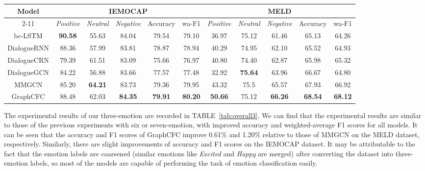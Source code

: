 \documentclass[lettersize,journal]{IEEEtran}
\begin{document}
\begin{table*}[hbtp]
\centering
\renewcommand{\arraystretch}{1.0}
\setlength{\tabcolsep}{5pt}
\caption{The Overall Performance After Converting the Dataset Into Three-Emotion Labels Under the Multimodal Setting}
\begin{tabular}{c|ccc|cc||ccc|cc}
\hline
\multicolumn{1}{c|}{\multirow{2}{*}{Model}} & \multicolumn{5}{c||}{IEMOCAP} & \multicolumn{5}{c}{MELD} \\
\cline{2-11}
& \textit{Positive} & \textit{Neutral} & \textit{Negative} & Accuracy & wa-F1 & \textit{Positive} & \textit{Neutral} & \textit{Negative} & Accuracy & wa-F1 \\
\hline
bc-LSTM & \textbf{90.58} & 55.63 & 84.04 & 79.54 & 79.10  & 36.97 & 75.12 & 61.46 & 65.13 & 64.26 \\
DialogueRNN & 88.36 & 57.99 & 83.81 & 78.87 & 78.94 & 40.29 & 74.95 & 62.10  & 65.52 & 64.93 \\
DialogueCRN & 79.39 & 61.51 & 83.09 & 75.66 & 76.97 & 40.80  & 74.40  & 62.87 & 65.98 & 65.32 \\
DialogueGCN & 84.22 & 56.88 & 83.66 & 77.57 & 77.48 & 32.92 & \textbf{75.64} & 63.96 & 66.67 & 64.80 \\
MMGCN & 85.20  & \textbf{64.21} & 83.73 & 79.36 & 79.95 & 43.32 & 75.5  & 65.57 & 67.93 & 66.92 \\
\hline
GraphCFC  & 88.48 & 62.03 & \textbf{84.35} & \textbf{79.91} & \textbf{80.20}  & \textbf{50.66} & 75.12 & \textbf{66.26} & \textbf{68.54} & \textbf{68.12} \\
\hline
\end{tabular}
\label{tab:overall3}
\end{table*}
The experimental results of our three-emotion are recorded in TABLE~\ref{tab:overall3}. We can find that the experimental results are similar to those of the previous experiments with six or seven-emotion, with improved accuracy and weighted-average F1 scores for all models. It can be seen that the accuracy and F1 scores of GraphCFC improve 0.61\% and 1.20\% relative to those of MMGCN on the MELD dataset, respectively. Similarly, there are slight improvements of accuracy and F1 scores on the IEMOCAP dataset. It may be attributable to the fact that the emotion labels are coarsened (similar emotions like \textit{Excited} and \textit{Happy} are merged) after converting the dataset into three-emotion labels, so most of the models are capable of performing the task of emotion classification easily.
\end{document}
